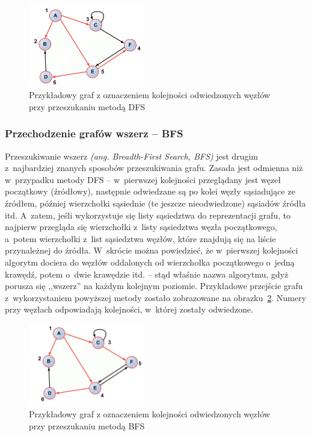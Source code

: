 \documentclass[twoside,12pt]{report}
\begin{document}
\begin{figure}[htbp]
	\centering
	\includegraphics[width=0.45\textwidth]{img/dfs}
	\caption{Przykładowy graf z oznaczeniem kolejności odwiedzonych węzłów przy przeszukaniu metodą DFS}
	\label{fig:dfs}
\end{figure}

\subsubsection{Przechodzenie grafów wszerz – BFS}
Przeszukiwanie wszerz \textit{(ang. Breadth-First Search, BFS)} jest drugim z~najbardziej znanych sposobów przeszukiwania grafu. Zasada jest odmienna niż w~przypadku metody DFS – w~pierwszej kolejności przeglądany jest węzeł początkowy (źródłowy), następnie odwiedzane są po kolei węzły sąsiadujące ze źródłem, później wierzchołki sąsiednie (te jeszcze nieodwiedzone) sąsiadów źródła itd. A~zatem, jeśli wykorzystuje się listy sąsiedztwa do reprezentacji grafu, to najpierw przegląda się wierzchołki z~listy sąsiedztwa węzła początkowego, a~potem wierzchołki z~list sąsiedztwa węzłów, które znajdują się na liście przynależnej do źródła. W~skrócie można powiedzieć, że w~pierwszej kolejności algorytm dociera do węzłów oddalonych od wierzchołka początkowego o~jedną krawędź, potem o~dwie krawędzie itd. – stąd właśnie nazwa algorytmu, gdyż porusza się ,,wszerz'' na każdym kolejnym poziomie. Przykładowe przejście grafu z~wykorzystaniem powyższej metody zostało zobrazowane na obrazku~\ref{fig:bfs}. Numery przy węzłach odpowiadają kolejności, w~której zostały odwiedzone.

\begin{figure}[htbp]
	\centering
	\includegraphics[width=0.45\textwidth]{img/bfs}
	\caption{Przykładowy graf z oznaczeniem kolejności odwiedzonych węzłów przy przeszukaniu metodą BFS}
	\label{fig:bfs}
\end{figure}
\end{document}
